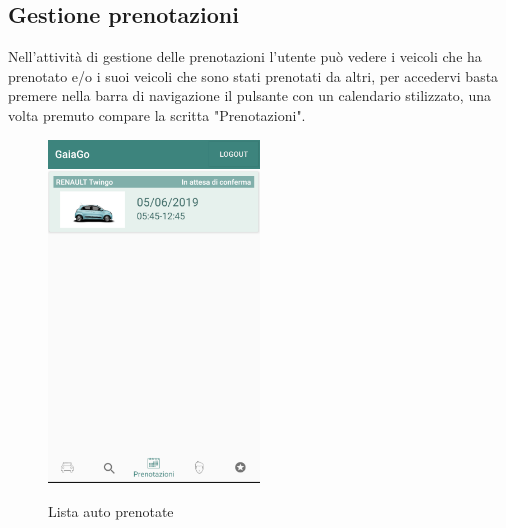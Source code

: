 \subsection{Gestione prenotazioni}
Nell'attività di gestione delle prenotazioni l'utente può vedere i veicoli che ha prenotato e/o i suoi veicoli che sono stati prenotati da altri, per accedervi basta premere nella barra di navigazione il pulsante con un calendario stilizzato, una volta premuto compare la scritta "Prenotazioni".
  \begin{figure}[H] 
	\centering 
	\includegraphics[width=0.5\textwidth]{res/images/prenotazione3.png}\\
	\caption{Lista auto prenotate}
	\label{prenotate}
\end{figure}
\pagebreak

